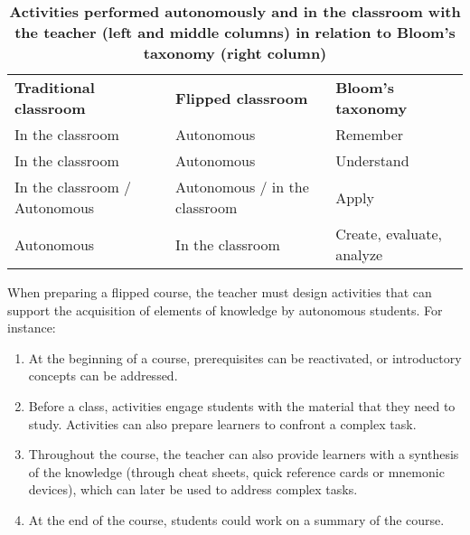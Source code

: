 \documentclass[10pt,letterpaper]{article}
\newlength\savedwidth
\newcommand\thickhline{\noalign{\global\savedwidth\arrayrulewidth\global\arrayrulewidth 2pt}%
\hline
\noalign{\global\arrayrulewidth\savedwidth}}
\begin{document}
\begin{table}[!ht]
\begin{adjustwidth}{-2.25in}{0in} %
\centering
\caption{{\bf Activities performed autonomously and in the classroom with the teacher (left and middle columns) in relation to Bloom's taxonomy (right column)}}
\begin{tabular}{|l|l|l|}
\hline
{\bf Traditional classroom} & {\bf Flipped classroom} & {\bf Bloom's taxonomy} \\ \thickhline
In the classroom & Autonomous & Remember \\ \hline
In the classroom & Autonomous & Understand \\ \hline
In the classroom / Autonomous & Autonomous / in the classroom & Apply \\ \hline
Autonomous & In the classroom & Create, evaluate, analyze \\ \hline



\end{tabular}
\label{table1}
\end{adjustwidth}
\end{table}


When preparing a flipped course, the teacher must design activities that can support 
the acquisition of elements of knowledge by autonomous students. For instance:

\begin{enumerate}

\item At the beginning of a course, prerequisites can be reactivated, or introductory concepts can be addressed.

\item Before a class, activities engage students with the material that they need to study. 
Activities can also prepare learners to confront a complex task.

\item Throughout the course, the teacher can also provide learners with a synthesis of the knowledge 
(through cheat sheets, quick reference cards or mnemonic devices), which can later be used to address complex tasks.

\item At the end of the course, students could work on a summary of the course.

\end{enumerate}
\end{document}
